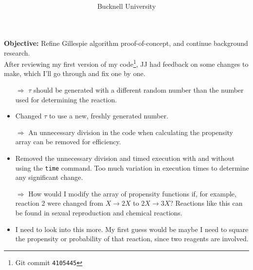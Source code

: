 \documentclass[oneside]{labbook}
\newcommand{\obj}[1]{\textbf{Objective:} #1\\}
\newcommand{\commit}[1]{\footnote{Git commit \texttt{#1}}}
\begin{document}
\title{
}

\author{
  \\ \\
  Bucknell University
}

\date{}

\maketitle

\printindex
\tableofcontents

\pagestyle{scrheadings}


\obj{Refine Gillespie algorithm proof-of-concept, and continue background research.}

After reviewing my first version of my code\commit{4105445}, JJ had
feedback on some changes to make, which I'll go through and fix one by one.

\begin{itemize}
  \item[$\Rightarrow$] $\tau$ should be generated with a different random number than the number used
  for determining the reaction.
  \item Changed $\tau$ to use a new, freshly generated number.

  \item[$\Rightarrow$] An unnecessary division in the code when calculating the
  propensity array can be removed for efficiency.
  \item Removed the unnecessary division and timed execution with and without
  using the \texttt{time} command. Too much variation in execution times to determine
  any significant change.

  \item[$\Rightarrow$] How would I modify the array of propensity functions if,
  for example, reaction 2 were changed from $X \rightarrow 2X$ to $2X \rightarrow 3X$?
  Reactions like this can be found in sexual reproduction and chemical reactions.
  \item I need to look into this more. My first guess would be maybe I need to
  square the propensity or probability of that reaction, since two reagents are involved.
\end{itemize}
\end{document}
